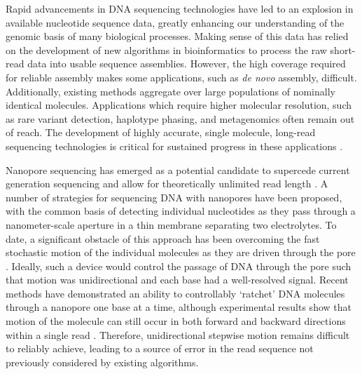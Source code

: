 \documentclass{biophys_letter}
\begin{document}
\twocolumn


Rapid advancements in DNA sequencing technologies have led to an explosion in available nucleotide sequence data, greatly enhancing our understanding of the genomic basis of many biological processes.
Making sense of this data has relied on the development of new algorithms in bioinformatics to process the raw short-read data into usable sequence assemblies.
However, the high coverage required for reliable assembly makes some applications, such as \emph{de novo} assembly, difficult.
Additionally, existing methods aggregate over large populations of nominally identical molecules.
Applications which require higher molecular resolution, such as rare variant detection, haplotype phasing, and metagenomics often remain out of reach.
The development of highly accurate, single molecule, long-read sequencing technologies is critical for sustained progress in these applications \cite{Mak:2012}.

Nanopore sequencing has emerged as a potential candidate to supercede current generation sequencing and allow for theoretically unlimited read length \cite{Branton:2008}.
A number of strategies for sequencing DNA with nanopores have been proposed, with the common basis of detecting individual nucleotides as they pass through a nanometer-scale aperture in a thin membrane separating two electrolytes.
To date, a significant obstacle of this approach has been overcoming the fast stochastic motion of the individual molecules as they are driven through the pore \cite{Venkatesan:2011, Lu:2011}.
Ideally, such a device would control the passage of DNA through the pore such that motion was unidirectional and each base had a well-resolved signal.
Recent methods have demonstrated an ability to controllably `ratchet' DNA molecules through a nanopore one base at a time, although experimental results show that motion of the molecule can still occur in both forward and backward directions within a single read \cite{Luan:2011, Olasagasti:2010, Cherf:2012}.
Therefore, unidirectional stepwise motion remains difficult to reliably achieve, leading to a source of error in the read sequence not previously considered by existing algorithms.
\end{document}
